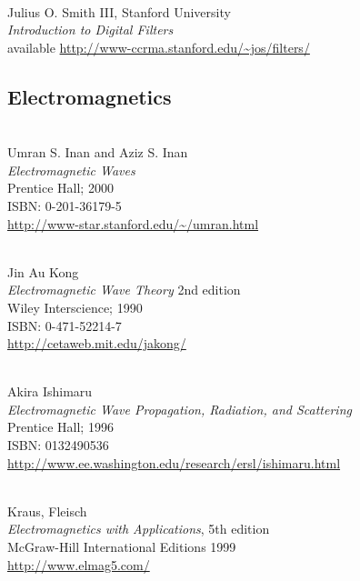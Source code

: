 \begin{thebibliography}{9}
\hspace{1pt}\\
   Julius O. Smith III, Stanford University \\
   {\em Introduction to Digital Filters} \\
   available \url{http://www-ccrma.stanford.edu/~jos/filters/} 

\subsection*{Electromagnetics}
 \hspace{1ex}\\
   Umran S. Inan and Aziz S. Inan \\
   {\em Electromagnetic Waves}  \\
   Prentice Hall; 2000 \\
   ISBN: 0-201-36179-5 \\
   \url{http://www-star.stanford.edu/~/umran.html}
   
 \hspace{1ex}\\
   Jin Au Kong \\
   {\em Electromagnetic Wave Theory} 2nd edition \\
   Wiley Interscience; 1990 \\
   ISBN: 0-471-52214-7 \\
   \url{http://cetaweb.mit.edu/jakong/}
   

 \hspace{1ex}\\
   Akira Ishimaru \\
   {\it Electromagnetic Wave Propagation, Radiation, and Scattering}  \\
   Prentice Hall; 1996 \\
   ISBN: 0132490536 \\
   \url{http://www.ee.washington.edu/research/ersl/ishimaru.html}
   

 \hspace{1ex}\\
   Kraus, Fleisch \\
   {\it Electromagnetics with Applications}, 5th edition\\
   McGraw-Hill International Editions 1999 \\
   \url{http://www.elmag5.com/} 



\end{thebibliography}
